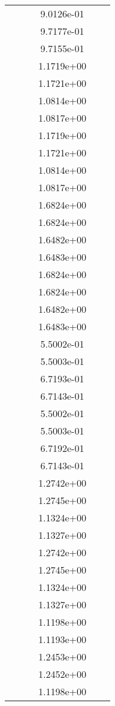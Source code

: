 \begin{xltabular}{\textwidth}{r|rS[table-format=1.3e+2]S[table-format=1.4e+2]S[table-format=1.4e+2]S[table-format=-1.5]}
&  &  & 9.0126e-01 & & \\
&  &  & 9.7177e-01 & & \\
&  &  & 9.7155e-01 & & \\
&  &  & 1.1719e+00 & & \\
&  &  & 1.1721e+00 & & \\
&  &  & 1.0814e+00 & & \\
&  &  & 1.0817e+00 & & \\
&  &  & 1.1719e+00 & & \\
&  &  & 1.1721e+00 & & \\
&  &  & 1.0814e+00 & & \\
&  &  & 1.0817e+00 & & \\
&  &  & 1.6824e+00 & & \\
&  &  & 1.6824e+00 & & \\
&  &  & 1.6482e+00 & & \\
&  &  & 1.6483e+00 & & \\
&  &  & 1.6824e+00 & & \\
&  &  & 1.6824e+00 & & \\
&  &  & 1.6482e+00 & & \\
&  &  & 1.6483e+00 & & \\
&  &  & 5.5002e-01 & & \\
&  &  & 5.5003e-01 & & \\
&  &  & 6.7193e-01 & & \\
&  &  & 6.7143e-01 & & \\
&  &  & 5.5002e-01 & & \\
&  &  & 5.5003e-01 & & \\
&  &  & 6.7192e-01 & & \\
&  &  & 6.7143e-01 & & \\
&  &  & 1.2742e+00 & & \\
&  &  & 1.2745e+00 & & \\
&  &  & 1.1324e+00 & & \\
&  &  & 1.1327e+00 & & \\
&  &  & 1.2742e+00 & & \\
&  &  & 1.2745e+00 & & \\
&  &  & 1.1324e+00 & & \\
&  &  & 1.1327e+00 & & \\
&  &  & 1.1198e+00 & & \\
&  &  & 1.1193e+00 & & \\
&  &  & 1.2453e+00 & & \\
&  &  & 1.2452e+00 & & \\
&  &  & 1.1198e+00 & & \\

\end{xltabular}

